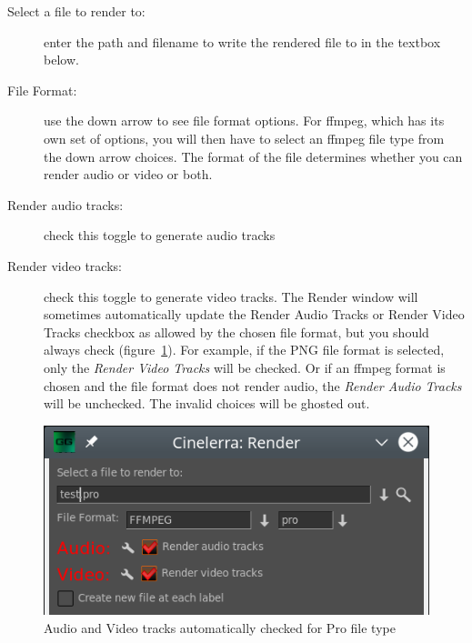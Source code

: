 \begin{description}
    \item[Select a file to render to:] enter the path and filename to write the rendered file to in the textbox below.
    \item[File Format:] use the down arrow to see file format options.  For ffmpeg, which has its own set of options, you will then have to select an ffmpeg file type from the down arrow choices. The format of the file determines whether you can render audio or video or both.
    \item[Render audio tracks:] check this toggle to generate audio tracks
    \item[Render video tracks:] check this toggle to generate video tracks. The Render window will sometimes automatically update the Render Audio Tracks or Render Video Tracks checkbox as allowed by the chosen file format, but you should always check (figure~\ref{fig:render01}).  For example, if the PNG file format is selected, only the \textit{Render Video Tracks} will be checked.  Or if an ffmpeg format is chosen and the file format does not render audio, the \textit{Render Audio Tracks} will be unchecked. The invalid choices will be ghosted out.
\end{description}

\begin{figure}[htpb]
    \centering
    \includegraphics[width=0.7\linewidth]{images/render01.png}
    \caption{Audio and Video tracks automatically checked for Pro file type}
    \label{fig:render01}
\end{figure}

